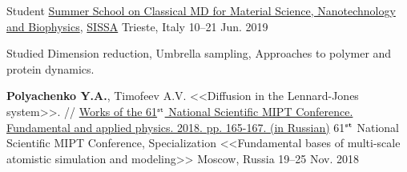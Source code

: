 \begin{cventries}
  \cventry
    {Student} %
    {\href{https://www.cecam.org/workshop-details/135}{Summer School on Classical MD for Material Science, Nanotechnology and Biophysics}, \href{https://www.sissa.it/}{SISSA}} %
    {Trieste, Italy} %
    {10--21 Jun. 2019} %
    {
      \begin{cvitems} %
        \item {Studied Dimension reduction, Umbrella sampling, Approaches to polymer and protein dynamics.}
      \end{cvitems}
    }
    
    
  \cventry
    {\textbf{Polyachenko Y.A.}, Timofeev A.V. <<Diffusion in the Lennard-Jones system>>. // \href{https://mipt.ru/science/5top100/education/!\%D0\%A4\%D0\%A4\%D0\%9F\%D0\%A4.pdf\#page=169}{Works of the 61$^{\texttt{\tiny st}}$ National Scientific MIPT Conference. Fundamental and applied physics. 2018. pp. 165-167. (in Russian)}} %
    {61$^{\textbf{\tiny st}}$ National Scientific MIPT Conference, Specialization <<Fundamental bases of multi-scale atomistic simulation and modeling>>} %
    {Moscow, Russia} %
    {19--25 Nov. 2018} %
    {}
    

\end{cventries}
